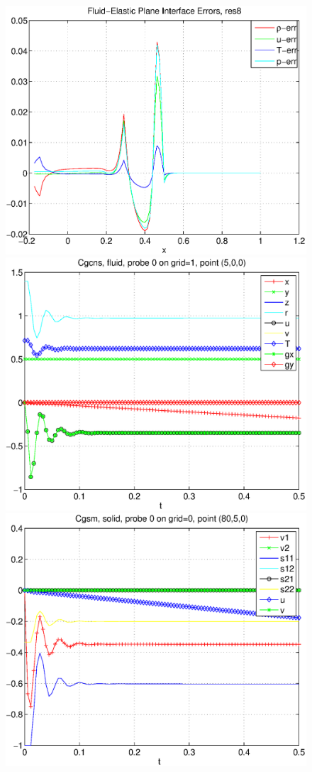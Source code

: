 {\begin{figure}[h]
\includegraphics[width=\fwidth]{fluidElastic_planeInterfacegErr_res8.eps}
\includegraphics[width=\fwidth]{planeInterfaceProbe8gFluid1.eps}
\includegraphics[width=\fwidth]{planeInterfaceProbe8gSolid1.eps}

\end{figure}}
